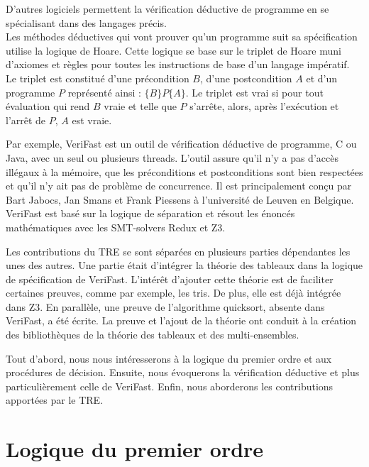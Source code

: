 \documentclass[11pt,openany]{article}
\newcommand{\verifast}{VeriFast}
\begin{document}
	D'autres logiciels permettent la v\'erification d\'eductive de programme en se sp\'ecialisant dans des langages pr\'ecis. \\Les m\'ethodes d\'eductives qui vont prouver qu'un programme suit sa sp\'ecification utilise la logique de Hoare. Cette logique se base sur le triplet de Hoare muni d'axiomes et r\`egles pour toutes les instructions de base d'un langage imp\'eratif. Le triplet est constitu\'e d'une pr\'econdition $B$, d'une postcondition $A$ et d'un programme $P$ repr\'esent\'e ainsi : $\{B\}P\{A\}$. Le triplet est vrai si pour tout \'evaluation qui rend $B$ vraie et telle que $P$ s'arr\^ete, alors, apr\`es l'ex\'ecution et l'arr\^et de $P$, $A$ est vraie.\par Par exemple, \verifast{} est un outil de v\'erification d\'eductive de programme, C ou Java, avec un seul ou plusieurs threads. L'outil assure qu'il n'y a pas d'acc\`es ill\'egaux \`a la m\'emoire, que les pr\'econditions et postconditions sont bien respect\'ees et qu'il n'y ait pas de probl\`eme de concurrence. Il est principalement con\c{c}u par Bart Jabocs, Jan Smans et Frank Piessens \`a l'universit\'e de Leuven en Belgique. \verifast{} est bas\'e sur la logique de s\'eparation et r\'esout les \'enonc\'es math\'ematiques avec les SMT-solvers Redux et Z3.\par
	 Les contributions du TRE se sont s\'epar\'ees en plusieurs parties d\'ependantes les unes des autres. Une partie \'etait d'int\'egrer la th\'eorie des tableaux dans la logique de sp\'ecification de \verifast. L'int\'er\^et d'ajouter cette th\'eorie est de faciliter certaines preuves, comme par exemple, les tris. De plus, elle est d\'ej\`a int\'egr\'ee dans Z3. En parall\`ele, une preuve de l'algorithme quicksort, absente dans \verifast, a \'et\'e \'ecrite. La preuve et l'ajout de la th\'eorie ont conduit \`a la cr\'eation des biblioth\`eques de la th\'eorie des tableaux et des multi-ensembles.\\ \par

Tout d'abord, nous nous int\'eresserons \`a la logique du premier ordre et aux proc\'edures de d\'ecision. Ensuite, nous \'evoquerons la v\'erification d\'eductive et plus particuli\`erement celle de \verifast. Enfin, nous aborderons les contributions apport\'ees par le TRE.

\section{Logique du premier ordre}
\end{document}
